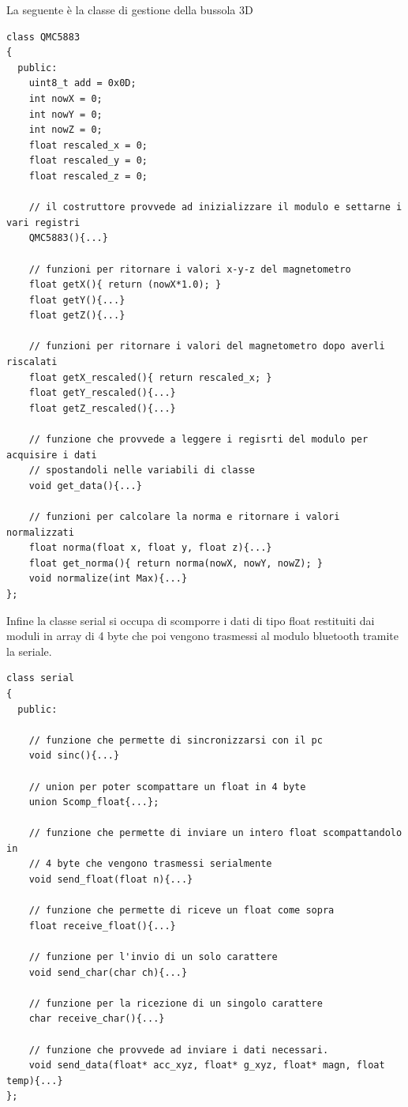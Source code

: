 \documentclass[10pt,a4paper]{article}
\begin{document}
La seguente è la classe di gestione della bussola 3D
\begin{lstlisting}[style=myArduino, caption=classe "QMC5883", captionpos=b]
class QMC5883
{
  public:
    uint8_t add = 0x0D;
    int nowX = 0;
    int nowY = 0;
    int nowZ = 0;
    float rescaled_x = 0; 
    float rescaled_y = 0;
    float rescaled_z = 0;
    
    // il costruttore provvede ad inizializzare il modulo e settarne i vari registri 
    QMC5883(){...}
    
    // funzioni per ritornare i valori x-y-z del magnetometro
    float getX(){ return (nowX*1.0); }
    float getY(){...}
    float getZ(){...}

    // funzioni per ritornare i valori del magnetometro dopo averli riscalati
    float getX_rescaled(){ return rescaled_x; }
    float getY_rescaled(){...}
    float getZ_rescaled(){...}
  
    // funzione che provvede a leggere i regisrti del modulo per acquisire i dati
    // spostandoli nelle variabili di classe
    void get_data(){...}

    // funzioni per calcolare la norma e ritornare i valori normalizzati 
    float norma(float x, float y, float z){...}
    float get_norma(){ return norma(nowX, nowY, nowZ); }
    void normalize(int Max){...}
};
\end{lstlisting}
%
%
Infine la classe serial si occupa di scomporre i dati di tipo float restituiti dai moduli in array di 4 byte che poi vengono trasmessi al modulo bluetooth tramite la seriale.
\begin{lstlisting}[style=myArduino, caption=classe "serial", captionpos=b]
class serial
{
  public:

    // funzione che permette di sincronizzarsi con il pc
    void sinc(){...}

    // union per poter scompattare un float in 4 byte
    union Scomp_float{...};

    // funzione che permette di inviare un intero float scompattandolo in 
    // 4 byte che vengono trasmessi serialmente
    void send_float(float n){...}

    // funzione che permette di riceve un float come sopra
    float receive_float(){...}

    // funzione per l'invio di un solo carattere
    void send_char(char ch){...}

    // funzione per la ricezione di un singolo carattere
    char receive_char(){...}

    // funzione che provvede ad inviare i dati necessari.
    void send_data(float* acc_xyz, float* g_xyz, float* magn, float temp){...} 
};
\end{lstlisting}
\end{document}
